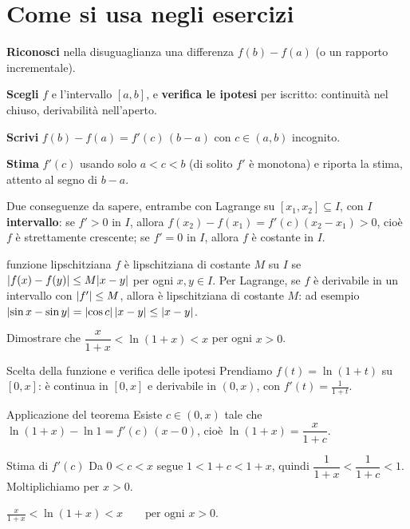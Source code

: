\documentclass[10pt]{article}
\begin{document}
\section{Come si usa negli esercizi}

\begin{metodo}
  \item \textbf{Riconosci} nella disuguaglianza una differenza $f(b) - f(a)$ (o un rapporto incrementale).
  \item \textbf{Scegli} $f$ e l'intervallo $[a, b]$, e \textbf{verifica le ipotesi} per iscritto: continuità nel chiuso, derivabilità nell'aperto.
  \item \textbf{Scrivi} $f(b) - f(a) = f'(c)\,(b - a)$ con $c \in (a, b)$ incognito.
  \item \textbf{Stima} $f'(c)$ usando solo $a < c < b$ (di solito $f'$ è monotona) e riporta la stima, attento al segno di $b - a$.
\end{metodo}

Due conseguenze da sapere, entrambe con Lagrange su $[x_1, x_2] \subseteq I$, con $I$ \textbf{intervallo}:
se $f' > 0$ in $I$, allora $f(x_2) - f(x_1) = f'(c)(x_2 - x_1) > 0$, cioè $f$ è strettamente crescente;
se $f' = 0$ in $I$, allora $f$ è costante in $I$.

\begin{definizione}{funzione lipschitziana}
$f$ è lipschitziana di costante $M$ su $I$ se $\lvert f(x) - f(y)\rvert \le M\lvert x - y\rvert$ per ogni $x, y \in I$.
Per Lagrange, se $f$ è derivabile in un intervallo con $\lvert f'\rvert \le M$, allora è lipschitziana di costante $M$:
ad esempio $\lvert\sin x - \sin y\rvert = \lvert\cos c\rvert\,\lvert x - y\rvert \le \lvert x - y\rvert$.
\end{definizione}

\begin{esempio}
Dimostrare che $\dfrac{x}{1+x} < \ln(1+x) < x$ per ogni $x > 0$.
\end{esempio}
\azzerapassi
\begin{passo}{Scelta della funzione e verifica delle ipotesi}
Prendiamo $f(t) = \ln(1+t)$ su $[0, x]$: è continua in $[0, x]$ e derivabile in $(0, x)$, con $f'(t) = \frac{1}{1+t}$.
\end{passo}
\begin{passo}{Applicazione del teorema}
Esiste $c \in (0, x)$ tale che $\ln(1+x) - \ln 1 = f'(c)\,(x - 0)$, cioè $\ln(1+x) = \dfrac{x}{1+c}$.
\end{passo}
\begin{passo}{Stima di $f'(c)$}
Da $0 < c < x$ segue $1 < 1 + c < 1 + x$, quindi $\dfrac{1}{1+x} < \dfrac{1}{1+c} < 1$. Moltiplichiamo per $x > 0$.
\end{passo}
\begin{risultato}
$\displaystyle \frac{x}{1+x} < \ln(1+x) < x \qquad \text{per ogni } x > 0.$
\end{risultato}
\end{document}
